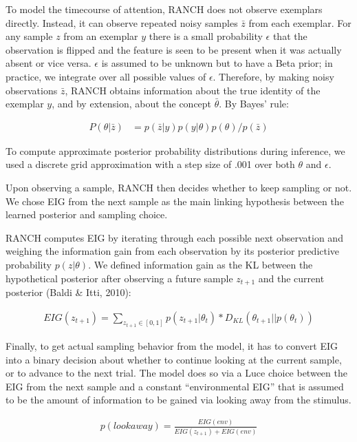 \documentclass[
  man,floatsintext]{apa6}
\begin{document}
To model the timecourse of attention, RANCH does not observe exemplars directly. Instead, it can observe repeated noisy samples \(\bar{z}\) from each exemplar. For any sample \(z\) from an exemplar \(y\) there is a small probability \(\epsilon\) that the observation is flipped and the feature is seen to be present when it was actually absent or vice versa. \(\epsilon\) is assumed to be unknown but to have a Beta prior; in practice, we integrate over all possible values of \(\epsilon\). Therefore, by making noisy observations \(\bar{z}\), RANCH obtains information about the true identity of the exemplar \(y\), and by extension, about the concept \(\bar{\theta}\). By Bayes' rule:

\begin{eqnarray}
P(\theta|\bar{z}) &= p(\bar{z}|y) p(y|\theta) p(\theta) / p(\bar{z})
\end{eqnarray}

To compute approximate posterior probability distributions during inference, we used a discrete grid approximation with a step size of .001 over both \(\theta\) and \(\epsilon\).

Upon observing a sample, RANCH then decides whether to keep sampling or not. We chose EIG from the next sample as the main linking hypothesis between the learned posterior and sampling choice.

RANCH computes EIG by iterating through each possible next observation and weighing the information gain from each observation by its posterior predictive probability \(p(z|\theta)\). We defined information gain as the KL between the hypothetical posterior after observing a future sample \(z_{t+1}\) and the current posterior (Baldi \& Itti, 2010):

\begin{eqnarray}
EIG(z_{t+1}) = \sum_{z_{t+1} \in [0,1]} p(z_{t+1}|\theta_t) * D_{KL}(\theta_{t+1} || p(\theta_t))
\end{eqnarray}

Finally, to get actual sampling behavior from the model, it has to convert EIG into a binary decision about whether to continue looking at the current sample, or to advance to the next trial. The model does so via a Luce choice between the EIG from the next sample and a constant ``environmental EIG'' that is assumed to be the amount of information to be gained via looking away from the stimulus.

\begin{eqnarray}
p(look away) = \frac{EIG(env)}{EIG(z_{t+1})+EIG(env)}
\end{eqnarray}
\end{document}
